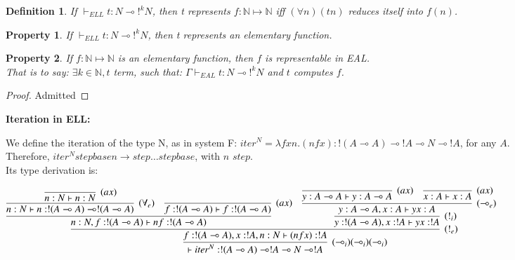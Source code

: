 \documentclass[a4paper,10pt]{article}
\newcommand{\limpl}{\multimap}  %
\newcommand{\Nset}{\mathbb{N}} %
\newtheorem{definition}{Definition}
\newtheorem{prop}{Property}
\begin{document}
\begin{definition}
If $\vdash_{ELL} t: N \limpl !^{k} N$, then \emph{t represents} $f:\Nset \mapsto \Nset$ iff $(\forall n) (t n)$ reduces itself into $f(n)$.
\end{definition}

\begin{prop}
If $\vdash_{ELL} t:N \limpl !^{k} N$, then t represents an elementary function.
\end{prop}

\begin{prop}
If $f: \Nset \mapsto \Nset$ is an elementary function, then $f$ is representable in EAL.\\
That is to say: $\exists k \in \Nset, t$ term, such that: $\Gamma \vdash_{EAL} t: N \limpl !^{k} N$ and $t$ computes $f$.
\end{prop}
\begin{proof}
Admitted
\end{proof}


\vspace{0.5cm}
\textbf{Iteration in ELL:}

\par We define the iteration of the type N, as in system F: $iter^N = \lambda f x n. (n f x) : !(A \limpl A) \limpl !A \limpl N \limpl !A$, for any $A$.\\
Therefore, $iter^N step base n \rightarrow step \dots step base$, with $n$ $step$.\\
Its type derivation is:
\begin{center}
$	\infer[(\limpl_i) (\limpl_i) (\limpl_i)]{\vdash iter^N: !(A \limpl A) \limpl !A \limpl N \limpl !A}{
		\infer[(!_e)]{f:!(A \limpl A), x:!A, n:N \vdash (n f x): !A}{
			\infer{n:N, f:!(A \limpl A) \vdash n f: !(A \limpl A)}{
				\infer[(\forall_e)]{n:N \vdash n: !(A\limpl A) \limpl !(A \limpl A)}{
					\infer[(ax)]{n:N \vdash n:N}{}
				}
				&
				\infer[(ax)]{f:!(A\limpl A) \vdash f:!(A\limpl A)}{}
			}
			&
			\infer[(!_i)]{y:!(A\limpl A), x:!A \vdash y x:!A}{
				\infer[(\limpl_e)]{y:A\limpl A, x:A \vdash y x:A}{
					\infer[(ax)]{y:A\limpl A \vdash y:A \limpl A}{}
					&
					\infer[(ax)]{x:A \vdash x:A}{}
				}
			}
		}
	}$
\end{center}
\end{document}

